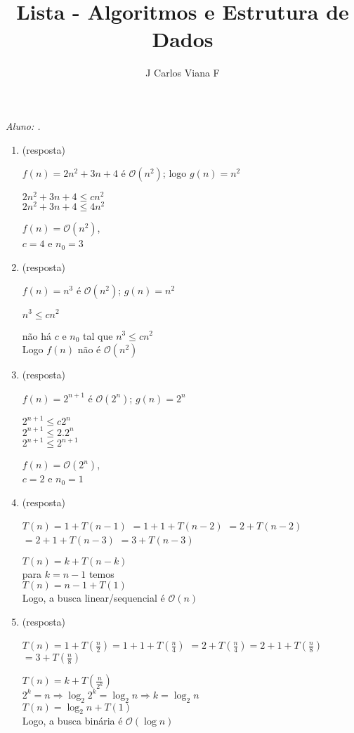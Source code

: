 \documentclass[12pt, a4paper]{article}
\title{Lista - Algoritmos e Estrutura de Dados}
\author{J Carlos Viana F}
\date{}
\begin{document}
\makeatletter
\begin{center}

\texttt{\Large \@title}
\end{center}

\emph{Aluno: \@author.}
\makeatother


\begin{enumerate}

\item (resposta)


$f(n) = 2n^{2}+3n+4$ é $\mathcal{O}(n^{2})$; logo $g(n)=n^{2}$

$2n^{2}+3n+4 \leq cn^{2}$\\
$2n^{2}+3n+4 \leq 4n^{2}$

$f(n)=\mathcal{O}(n^{2})$,\\
$c=4$ e $n_{0}=3$

\item (resposta)

$f(n)=n^{3}$ é $\mathcal{O}(n^{2})$; $g(n)=n^{2}$

$n^{3} \leq cn^{2}$

não há $c$ e $n_{0}$ tal que $n^{3} \leq cn^{2}$\\
Logo $f(n)$ não é $\mathcal{O}(n^{2})$

\item (resposta)

$f(n)=2^{n+1}$ é $\mathcal{O}(2^{n})$; $g(n)=2^{n}$

$2^{n+1} \leq c2^{n}$\\
$2^{n+1} \leq 2.2^{n}$\\
$2^{n+1} \leq 2^{n+1}$

$f(n)=\mathcal{O}(2^{n})$,\\
$c=2$ e $n_{0}=1$

\item (resposta)

$T(n)=1+T(n-1)$
$=1+1+T(n-2)$
$=2+T(n-2)$
$=2+1+T(n-3)$
$=3+T(n-3)$

$T(n)=k+T(n-k)$\\
para $k=n-1$ temos\\
$T(n)=n-1+T(1)$\\
Logo, a busca linear/sequencial é $\mathcal{O}(n)$

\item (resposta)

$T(n)=1+T(\frac{n}{2})=1+1+T(\frac{n}{4})$
$=2+T(\frac{n}{4})=2+1+T(\frac{n}{8})$
$=3+T(\frac{n}{8})$

$T(n)=k+T(\frac{n}{2^{k}})$\\
$2^{k}=n \Rightarrow \log_{2}2^{k}=\log_{2}n \Rightarrow k=\log_{2}n$\\
$T(n)=\log_{2}n+T(1)$\\
Logo, a busca binária é $\mathcal{O}(\log n)$


\end{enumerate}
\end{document}
